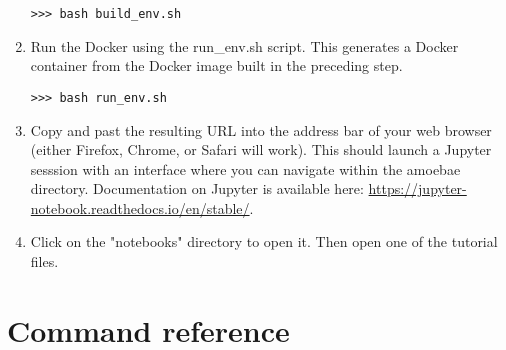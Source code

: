 \documentclass[12pt,letterpaper]{article}
\begin{document}
\begin{linenumbers}
\begin{enumerate}
\begin{lstlisting}
>>> bash build_env.sh
\end{lstlisting}


\item Run the Docker using the run\_env.sh script. This generates a Docker
    container from the Docker image built in the preceding step. 

\begin{lstlisting}
>>> bash run_env.sh
\end{lstlisting}


\item Copy and past the resulting URL into the address bar of your web browser
    (either Firefox, Chrome, or Safari will work). This should launch a Jupyter
    sesssion with an interface where you can navigate within the amoebae directory.
    Documentation on Jupyter is available here:
    \url{https://jupyter-notebook.readthedocs.io/en/stable/}. 


\item Click on the "notebooks" directory to open it. Then open one of the
    tutorial files.  


\end{enumerate}

\section{Command reference}

%
%
%
%
%
%
%


\end{linenumbers}
\end{document}
